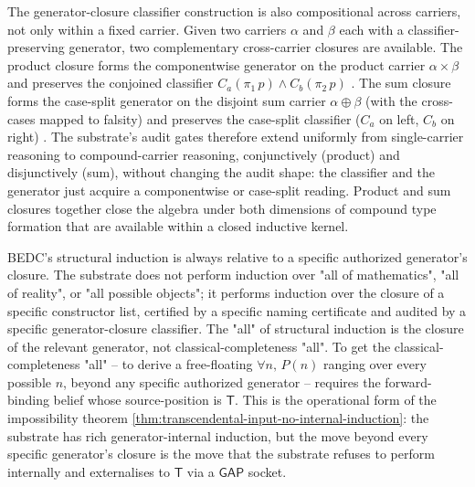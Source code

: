\begin{principle}
\label{prin:certificate-closure-classifier-product}
The generator-closure classifier construction is also compositional across carriers, not only within a fixed carrier. Given two carriers $\alpha$ and $\beta$ each with a classifier-preserving generator, two complementary cross-carrier closures are available. The product closure forms the componentwise generator on the product carrier $\alpha \times \beta$ and preserves the conjoined classifier $C_a(\pi_1\,p) \wedge C_b(\pi_2\,p)$ . The sum closure forms the case-split generator on the disjoint sum carrier $\alpha \oplus \beta$ (with the cross-cases mapped to falsity) and preserves the case-split classifier ($C_a$ on left, $C_b$ on right) . The substrate's audit gates therefore extend uniformly from single-carrier reasoning to compound-carrier reasoning, conjunctively (product) and disjunctively (sum), without changing the audit shape: the classifier and the generator just acquire a componentwise or case-split reading. Product and sum closures together close the algebra under both dimensions of compound type formation that are available within a closed inductive kernel.
\end{principle}

\begin{principle}
\label{prin:certificate-closure-structure-internal-all-external}
BEDC's structural induction is always relative to a specific authorized generator's closure. The substrate does not perform induction over "all of mathematics", "all of reality", or "all possible objects"; it performs induction over the closure of a specific constructor list, certified by a specific naming certificate and audited by a specific generator-closure classifier. The "all" of structural induction is the closure of the relevant generator, not classical-completeness "all". To get the classical-completeness "all" -- to derive a free-floating $\forall n,\, P(n)$ ranging over every possible $n$, beyond any specific authorized generator -- requires the forward-binding belief whose source-position is $\mathsf{T}$. This is the operational form of the impossibility theorem \autoref{thm:transcendental-input-no-internal-induction}: the substrate has rich generator-internal induction, but the move beyond every specific generator's closure is the move that the substrate refuses to perform internally and externalises to $\mathsf{T}$ via a $\mathsf{GAP}$ socket.
\end{principle}

